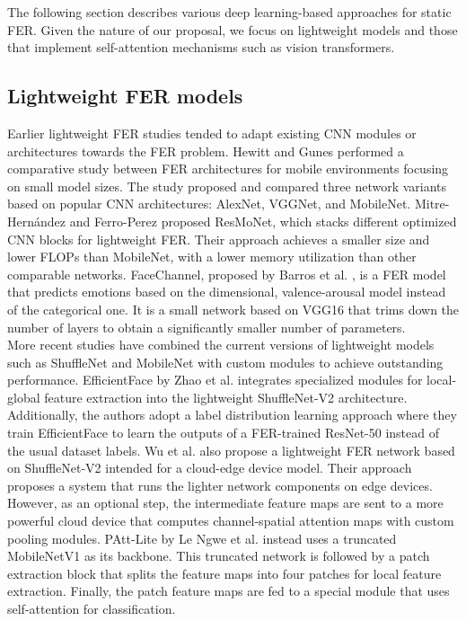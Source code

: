 The following section describes various deep learning-based approaches for static FER.
Given the nature of our proposal, we focus on lightweight models and those that implement self-attention mechanisms such as vision transformers.

\subsection{Lightweight FER models}

Earlier lightweight FER studies tended to adapt existing CNN modules or architectures towards the FER problem.
Hewitt and Gunes \cite{hewitt2018} performed a comparative study between FER architectures for mobile environments focusing on small model sizes.
The study proposed and compared three network variants based on popular CNN architectures: AlexNet, VGGNet, and MobileNet. 
Mitre-Hernández and Ferro-Perez \cite{mitre2020} proposed ResMoNet, which stacks different optimized CNN blocks for lightweight FER.
Their approach achieves a smaller size and lower FLOPs than MobileNet, with a lower memory utilization than other comparable networks.
FaceChannel, proposed by Barros et al. \cite{barros2020fc}, is a FER model that predicts emotions based on the dimensional, valence-arousal model instead of the categorical one.
It is a small network based on VGG16 that trims down the number of layers to obtain a significantly smaller number of parameters.\\

More recent studies have combined the current versions of lightweight models such as ShuffleNet and MobileNet with custom modules to achieve outstanding performance.
EfficientFace by Zhao et al. \cite{eff-face2021} integrates specialized modules for local-global feature extraction into the lightweight ShuffleNet-V2 architecture.
Additionally, the authors adopt a label distribution learning approach where they train EfficientFace to learn the outputs of a FER-trained ResNet-50 instead of the usual dataset labels.
Wu et al. \cite{wu2020edge} also propose a lightweight FER network based on ShuffleNet-V2 intended for a cloud-edge device model.
Their approach proposes a system that runs the lighter network components on edge devices.
However, as an optional step, the intermediate feature maps are sent to a more powerful cloud device that computes channel-spatial attention maps with custom pooling modules.
PAtt-Lite by Le Ngwe et al. \cite{lengwe2023pattlite} instead uses a truncated MobileNetV1 as its backbone.
This truncated network is followed by a patch extraction block that splits the feature maps into four patches for local feature extraction.
Finally, the patch feature maps are fed to a special module that uses self-attention for classification.\\

